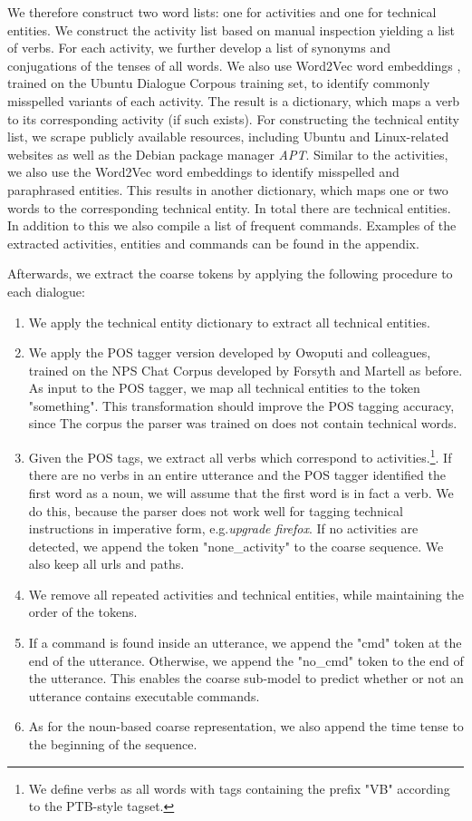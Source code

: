 \documentclass{article}
\begin{document}
We therefore construct two word lists: one for activities and one for technical entities. We construct the activity list based on manual inspection yielding a list of  verbs. For each activity, we further develop a list of synonyms and conjugations of the tenses of all words. We also use Word2Vec word embeddings \cite{mikolov2013distributedbetter}, trained on the Ubuntu Dialogue Corpous training set, to identify commonly misspelled variants of each activity. The result is a dictionary, which maps a verb to its corresponding activity (if such exists). For constructing the technical entity list, we scrape publicly available resources, including Ubuntu and Linux-related websites as well as the Debian package manager \textit{APT}. Similar to the activities, we also use the Word2Vec word embeddings to identify misspelled and paraphrased entities. This results in another dictionary, which maps one or two words to the corresponding technical entity. In total there are  technical entities. In addition to this we also compile a list of  frequent commands. Examples of the extracted activities, entities and commands can be found in the appendix.

Afterwards, we extract the coarse tokens by applying the following procedure to each dialogue:

\begin{enumerate}
\item We apply the technical entity dictionary to extract all technical entities.
\item We apply the POS tagger version  developed by Owoputi and colleagues, trained on the NPS Chat Corpus developed by Forsyth and Martell as before. As input to the POS tagger, we map all technical entities to the token "something". This transformation should improve the POS tagging accuracy, since The corpus the parser was trained on does not contain technical words.
\item Given the POS tags, we extract all verbs which correspond to activities.\footnote{We define verbs as all words with tags containing the prefix "VB" according to the PTB-style tagset.}. If there are no verbs in an entire utterance and the POS tagger identified the first word as a noun, we will assume that the first word is in fact a verb. We do this, because the parser does not work well for tagging technical instructions in imperative form, e.g.\@ \textit{upgrade firefox}. If no activities are detected, we append the token "none\_activity" to the coarse sequence. We also keep all urls and paths.
\item We remove all repeated activities and technical entities, while maintaining the order of the tokens.
\item If a command is found inside an utterance, we append the "cmd" token at the end of the utterance. Otherwise, we append the "no\_cmd" token to the end of the utterance. This enables the coarse sub-model to predict whether or not an utterance contains executable commands.
\item As for the noun-based coarse representation, we also append the time tense to the beginning of the sequence.
\end{enumerate}
\end{document}
